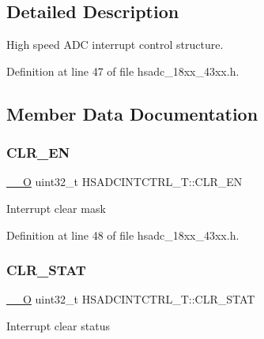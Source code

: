 \subsection{Detailed Description}
High speed A\+DC interrupt control structure. 

Definition at line 47 of file hsadc\+\_\+18xx\+\_\+43xx.\+h.



\subsection{Member Data Documentation}
\mbox{\label{struct_h_s_a_d_c_i_n_t_c_t_r_l___t_aecdb98966b688846b68ea7ddd9347271}} 
\subsubsection{\texorpdfstring{C\+L\+R\+\_\+\+EN}{CLR\_EN}}
{\footnotesize\ttfamily \hyperlink{core__sc300_8h_a7e25d9380f9ef903923964322e71f2f6}{\+\_\+\+\_\+O} uint32\+\_\+t H\+S\+A\+D\+C\+I\+N\+T\+C\+T\+R\+L\+\_\+\+T\+::\+C\+L\+R\+\_\+\+EN}

Interrupt clear mask 

Definition at line 48 of file hsadc\+\_\+18xx\+\_\+43xx.\+h.

\mbox{\label{struct_h_s_a_d_c_i_n_t_c_t_r_l___t_a9912db69ac4663ccef65a1acb5317ebe}} 
\subsubsection{\texorpdfstring{C\+L\+R\+\_\+\+S\+T\+AT}{CLR\_STAT}}
{\footnotesize\ttfamily \hyperlink{core__sc300_8h_a7e25d9380f9ef903923964322e71f2f6}{\+\_\+\+\_\+O} uint32\+\_\+t H\+S\+A\+D\+C\+I\+N\+T\+C\+T\+R\+L\+\_\+\+T\+::\+C\+L\+R\+\_\+\+S\+T\+AT}

Interrupt clear status 

